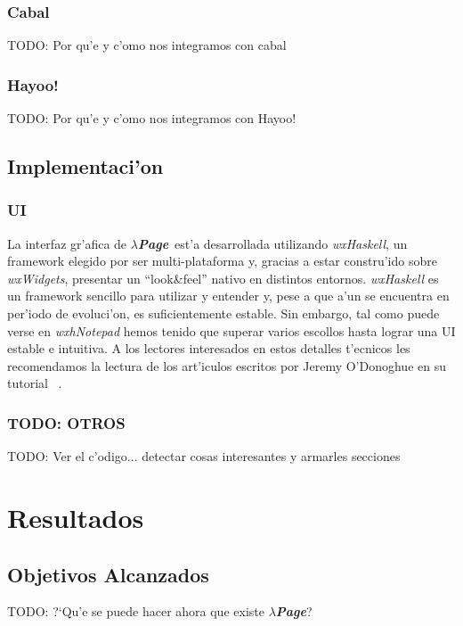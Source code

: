 \documentclass[a4paper]{article}
\newcommand{\hpage}{\textbf{\textsl{$\lambda$Page}}}
\begin{document}
\subsubsection{Cabal}TODO: Por qu'e y c'omo nos integramos con cabal
\subsubsection{Hayoo!}TODO: Por qu'e y c'omo nos integramos con Hayoo!

\subsection{Implementaci'on}
\begin{epigraphs}
\end{epigraphs}
\subsubsection{UI} La interfaz gr'afica de \hpage\ est'a desarrollada utilizando \textsl{wxHaskell}, un framework elegido por ser multi-plataforma y, gracias a estar constru'ido sobre \textsl{wxWidgets}, presentar un ``look\&feel'' nativo en distintos entornos.  \textsl{wxHaskell} es un framework sencillo para utilizar y entender y, pese a que a'un se encuentra en per'iodo de evoluci'on, es suficientemente estable.  Sin embargo, tal como puede verse en \textsl{wxhNotepad} hemos tenido que superar varios escollos hasta lograr una UI estable e intuitiva.  A los lectores interesados en estos detalles t'ecnicos les recomendamos la lectura de los art'iculos escritos por Jeremy O'Donoghue en su tutorial \ .
\subsubsection{TODO: OTROS}TODO: Ver el c'odigo... detectar cosas interesantes y armarles secciones

\section{Resultados}
\subsection{Objetivos Alcanzados}
\begin{epigraphs}
\end{epigraphs}
TODO: ?`Qu'e se puede hacer ahora que existe \hpage?
\end{document}
